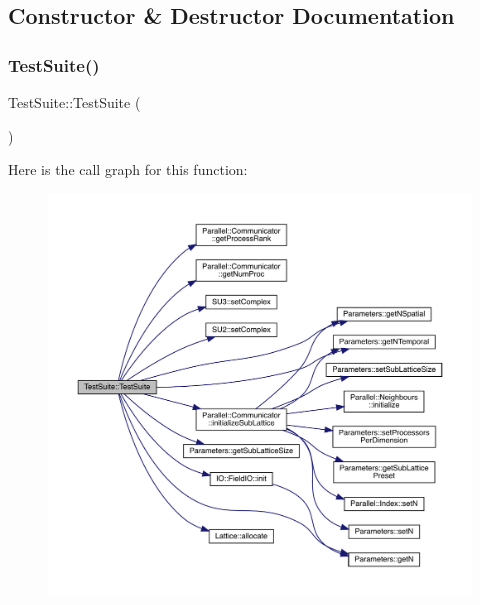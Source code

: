 \subsection{Constructor \& Destructor Documentation}
\mbox{\label{class_test_suite_af7291e6d8b53443604ee0c1fcf1fadfc}} 
\subsubsection{\texorpdfstring{TestSuite()}{TestSuite()}}
{\footnotesize\ttfamily Test\+Suite\+::\+Test\+Suite (\begin{DoxyParamCaption}{ }\end{DoxyParamCaption})}

Here is the call graph for this function\+:
\nopagebreak
\begin{figure}[H]
\begin{center}
\leavevmode
\includegraphics[width=350pt]{class_test_suite_af7291e6d8b53443604ee0c1fcf1fadfc_cgraph}
\end{center}
\end{figure}
\mbox{\label{class_test_suite_a1a4603e985169c62d251876dd3910b5e}} 
